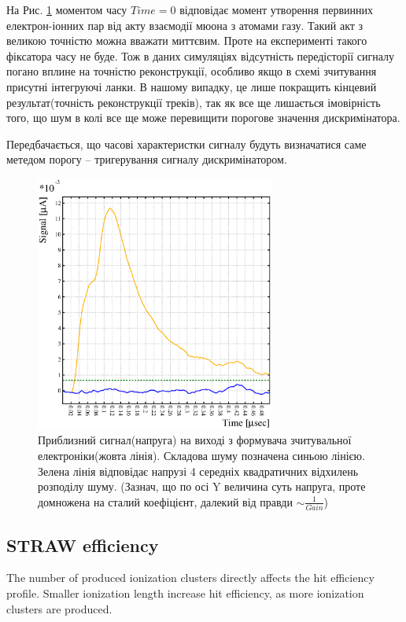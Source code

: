 \documentclass[]{article}
\begin{document}
	На Рис. \ref{fig:signal_example} моментом часу $Time=0$ відповідає момент утворення первинних електрон-іонних пар від акту взаємодії мюона з атомами газу. Такий акт з великою точністю можна вважати миттєвим. Проте на експерименті такого фіксатора часу не буде. Тож в даних симуляціях відсутність передісторії сигналу погано вплине на точністю реконструкції, особливо якщо в схемі зчитування присутні інтегруючі ланки. В нашому випадку, це лише покращить кінцевий результат(точність реконструкції треків), так як все ще лишається імовірність того, що шум в колі все ще може перевищити порогове значення дискримінатора.
	
	Передбачається, що часові характеристки сигналу будуть визначатися саме метедом порогу -- тригерування  сигналу дискримінатором.
	
	\begin{figure}
	\centering
	\includegraphics[width=0.7\textwidth]{signal_noise_threshold.eps}
	\caption{ Приблизний сигнал(напруга) на виході з формувача зчитувальної електроніки(жовта лінія). Складова шуму позначена синьою лінією. Зелена лінія відповідає напрузі 4 середніх квадратичних відхилень розподілу шуму. (Зазнач, що по осі Y величина суть напруга, проте домножена на сталий коефіцієнт, далекий від правди $\sim \frac{1}{Gain}$)}
	\label{fig:signal_example}
	\end{figure}
	
	
	
	\subsection{ STRAW efficiency}
	The number of produced ionization clusters directly affects the hit efficiency profile. \cite{kozlinskiy} Smaller ionization length increase hit efficiency, as more ionization clusters are produced.
	
\end{document}
